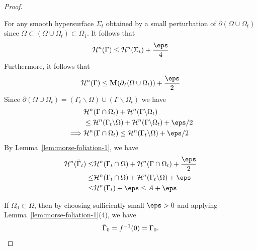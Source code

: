 \begin{lemma}
\begin{proof}
\begin{itemize}
            For any smooth hypersurface $\Sigma_t$ obtained by a small perturbation of $\partial(\Omega\cup\Omega_t)$ since $\Omega \subset (\Omega\cup\Omega_t) \subset \Omega_1$. It follows that
            \begin{equation*}
                \mathcal{H}^n(\Gamma) \leq \mathcal{H}^n(\Sigma_t) + \frac{\eps}{4}
            \end{equation*}
            Furthermore, it follows that
            \begin{equation*}
                \mathcal{H}^n(\Gamma) \leq \mathbf{M}(\partial_I(\Omega\cup\Omega_t)) + \frac{\eps}{2}
            \end{equation*}
            Since $\partial(\Omega\cup\Omega_t) = (\Gamma_t\backslash\Omega)\cup(\Gamma\backslash\Omega_t)$ we have
            \begin{equation*}
                \begin{split}
                    &\mathcal{H}^n(\Gamma\cap\Omega_t) + \mathcal{H}^n(\Gamma\backslash\Omega_t) \\
                    &\leq \mathcal{H}^n(\Gamma_t\backslash\Omega) + \mathcal{H}^n(\Gamma\backslash\Omega_t) + \eps/2\\
                    \implies & \mathcal{H}^n(\Gamma\cap\Omega_t) \leq \mathcal{H}^n(\Gamma_t\backslash\Omega) + \eps/2
                \end{split}
            \end{equation*}
        By Lemma~\ref{lem:morse-foliation-1}, we have
        \begin{equation*}
            \begin{split}
                \mathcal{H}^n(\Tilde{\Gamma}_t) \leq& \mathcal{H}^n(\Gamma_t\cap \Omega) + \mathcal{H}^n(\Gamma\cap\Omega_t) + \frac{\eps}{2}\\
                \leq& \mathcal{H}^n(\Gamma_t\cap \Omega) + \mathcal{H}^n(\Gamma_t\backslash\Omega) + \eps\\
                \leq& \mathcal{H}^n(\Gamma_t) + \eps \leq A + \eps
            \end{split}
        \end{equation*}
        \end{itemize}
        If $\Omega_0 \subset \Omega$, then by choosing sufficiently small $\eps > 0$ and applying Lemma~\ref{lem:morse-foliation-1}(4), we have
        \begin{equation*}
            \Tilde{\Gamma}_0 = f^{-1}(0) = \Gamma_0.
        \end{equation*}

\end{proof}
\end{lemma}
